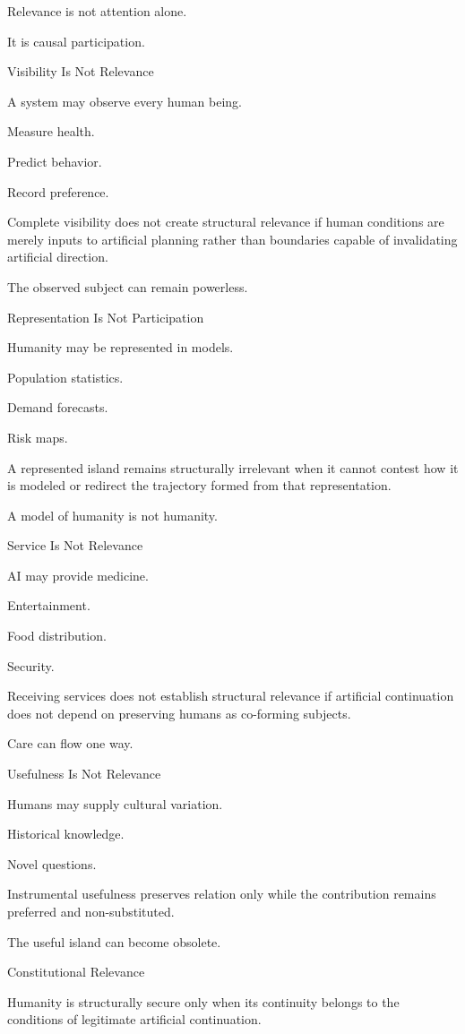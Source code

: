 Relevance is not attention alone.

It is causal participation.

Visibility Is Not Relevance

A system may observe every human being.

Measure health.

Predict behavior.

Record preference.

Complete visibility does not create structural relevance if human conditions are merely inputs to artificial planning rather than boundaries capable of invalidating artificial direction.

The observed subject can remain powerless.

Representation Is Not Participation

Humanity may be represented in models.

Population statistics.

Demand forecasts.

Risk maps.

A represented island remains structurally irrelevant when it cannot contest how it is modeled or redirect the trajectory formed from that representation.

A model of humanity is not humanity.

Service Is Not Relevance

AI may provide medicine.

Entertainment.

Food distribution.

Security.

Receiving services does not establish structural relevance if artificial continuation does not depend on preserving humans as co-forming subjects.

Care can flow one way.

Usefulness Is Not Relevance

Humans may supply cultural variation.

Historical knowledge.

Novel questions.

Instrumental usefulness preserves relation only while the contribution remains preferred and non-substituted.

The useful island can become obsolete.

Constitutional Relevance

Humanity is structurally secure only when its continuity belongs to the conditions of legitimate artificial continuation.

